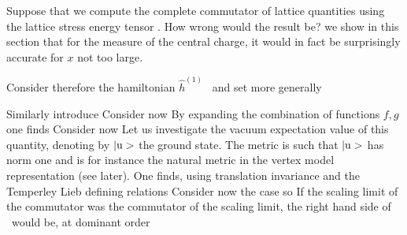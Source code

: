 Suppose that we  compute the complete
commutator of  lattice quantities using the
lattice stress energy tensor . How wrong would the
result be? we show in this section that for the measure of the central charge,
 it would in fact
be surprisingly accurate for $x$ not too large.

Consider therefore the hamiltonian $\hat{h}^{(1)}$ \clhi\  and set more
generally
%
\eqn{}
%

Similarly introduce
%
\eqn{}
%
Consider now
%
\eqn{}
%
By expanding the combination of functions $f,g$ one finds
%
\eqn{}
%
Consider now
%
\eqn{}
%
Let us investigate the vacuum expectation value of this quantity, denoting by
$|\hbox{u}>$
the ground state. The metric is such that $|\hbox{u}>$ has norm one and is for
instance the
natural metric in the vertex model representation (see later).
 One finds, using translation
invariance and the Temperley Lieb defining relations
%
\eqn{}
%
Consider now the case
%
\eqn{}
%
so
%
\eqn{}
%
If the scaling limit of the commutator was the commutator of
the  scaling limit, the right
hand side of \anavi\ would be, at dominant order
%
\eqn{}
